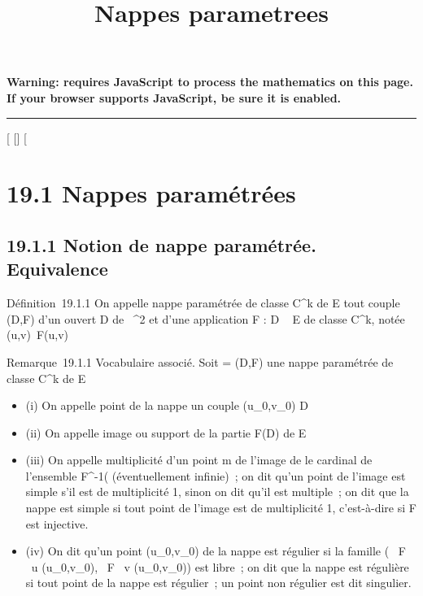 \documentclass[]{article}
\title{Nappes parametrees}
\author{}
\date{}
\begin{document}
\maketitle

\textbf{Warning: 
requires JavaScript to process the mathematics on this page.\\ If your
browser supports JavaScript, be sure it is enabled.}

\begin{center}\rule{3in}{0.4pt}\end{center}

[
[]
[

\section{19.1 Nappes paramétrées}

\subsection{19.1.1 Notion de nappe paramétrée. Equivalence}

Définition~19.1.1 On appelle nappe paramétrée de classe C^k
de E tout couple (D,F) d'un ouvert D de ~^2 et d'une
application F : D \rightarrow~ E de classe C^k, notée
(u,v)\mapsto~F(u,v)

Remarque~19.1.1 Vocabulaire associé. Soit \Sigma = (D,F) une nappe paramétrée
de classe C^k de E

\begin{itemize}
\itemsep1pt\parskip0pt
\item
  (i) On appelle point de la nappe \Sigma un couple
  (u_0,v_0) \in D
\item
  (ii) On appelle image ou support de \Sigma la partie F(D) de E
\item
  (iii) On appelle multiplicité d'un point m de l'image de \Sigma le cardinal
  de l'ensemble F^-1(\m\)
  (éventuellement infinie)~; on dit qu'un point de l'image est simple
  s'il est de multiplicité 1, sinon on dit qu'il est multiple~; on dit
  que la nappe est simple si tout point de l'image est de multiplicité
  1, c'est-à-dire si F est injective.
\item
  (iv) On dit qu'un point (u_0,v_0) de la nappe \Sigma est
  régulier si la famille ( \partial~F \over \partial~u
  (u_0,v_0), \partial~F \over \partial~v
  (u_0,v_0)) est libre~; on dit que la nappe est
  régulière si tout point de la nappe est régulier~; un point non
  régulier est dit singulier.
\end{itemize}
\end{document}
